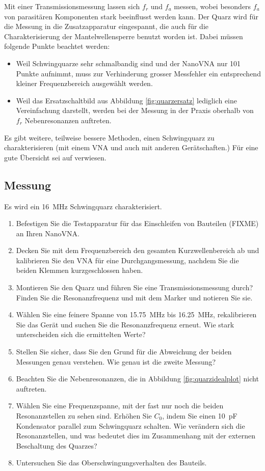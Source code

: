 \documentclass[twoside,a4paper,11pt,halfparskip,DIV=11,notitlepage]{scrartcl}
\begin{document}
Mit einer Transmissionsmessung lassen sich $f_r$ und $f_a$ messen, wobei besonders $f_a$ von parasitären Komponenten
stark beeinflusst werden kann. Der Quarz wird für die Messung in die Zusatzapparatur eingespannt, die auch für die
Charakterisierung der Mantelwellensperre benutzt worden ist. Dabei müssen folgende Punkte beachtet werden:

\begin{itemize}
    \item Weil Schwingquarze sehr schmalbandig sind und der NanoVNA nur 101 Punkte aufnimmt, muss zur Verhinderung grosser Messfehler ein entsprechend kleiner Frequenzbereich ausgewählt werden.
    \item Weil das Ersatzschaltbild aus Abbildung \ref{fig:quarzersatz} lediglich eine Vereinfachung darstellt, werden bei der Messung in der Praxis oberhalb von $f_r$ Nebenresonanzen auftreten.
\end{itemize}

Es gibt weitere, teilweise bessere Methoden, einen Schwingquarz zu charakterisieren (mit einem VNA und auch mit
anderen Gerätschaften.) Für eine gute Übersicht sei auf \cite{kortke2002} verwiesen.

\subsection{Messung}

Es wird ein 16~MHz Schwingquarz charakterisiert.

\begin{enumerate}
    \item Befestigen Sie die Testapparatur für das Einschleifen von Bauteilen (FIXME) an Ihren NanoVNA.
    \item Decken Sie mit dem Frequenzbereich den gesamten Kurzwellenbereich ab und kalibrieren Sie den VNA für eine
        Durchgangsmessung, nachdem Sie die beiden Klemmen kurzgeschlossen haben.
    \item Montieren Sie den Quarz und führen Sie eine Transmissionsmessung durch? Finden Sie die Resonanzfrequenz und
        mit dem Marker und notieren Sie sie.
    \item Wählen Sie eine feinere Spanne von 15.75~MHz bis 16.25~MHz,
        rekalibrieren Sie das Gerät und suchen Sie die Resonanzfrequenz erneut. Wie stark unterscheiden sich die ermittelten Werte?
    \item Stellen Sie sicher, dass Sie den Grund für die Abweichung der beiden Messungen genau verstehen. Wie genau ist die zweite Messung?
    \item Beachten Sie die Nebenresonanzen, die in Abbildung \ref{fig:quarzidealplot} nicht auftreten.
    \item Wählen Sie eine Frequenzspanne, mit der fast nur noch die beiden Resonanzstellen zu sehen sind. Erhöhen Sie $C_0$, indem Sie einen 10~pF Kondensator parallel zum Schwingquarz schalten. Wie verändern sich die Resonanzstellen, und was bedeutet dies im Zusammenhang mit der externen Beschaltung des Quarzes?
    \item Untersuchen Sie das Oberschwingungsverhalten des Bauteils.

\end{enumerate}
\end{document}
